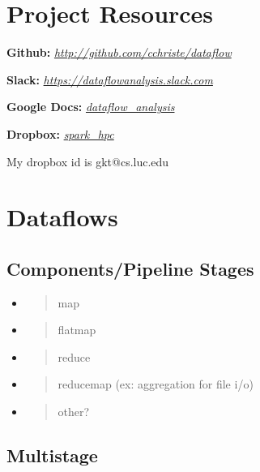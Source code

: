 \section{Project Resources}\label{project-resources}

\textbf{Github:}
\href{http://github.com/cchriste/dataflow}{\emph{http://github.com/cchriste/dataflow}}

\textbf{Slack:}
\href{https://dataflowanalysis.slack.com}{\emph{https://dataflowanalysis.slack.com}}

\textbf{Google Docs:}
\href{https://drive.google.com/folderview?id=0BxLkEMNd9q6FfmpRaFZXSGlPc0JsSDdVdndCUm83SzN6UnlLVEk5T3ZsZmJ0VEVGREtNTkE\&usp=sharing}{\emph{dataflow\_analysis}}

\textbf{Dropbox:}
\href{https://www.dropbox.com/sh/odsd9uxe1elbhbf/AAD8J1TGuFY1VHJl2oPdm5E0a?dl=0}{\emph{spark\_hpc}}

My dropbox id is gkt@cs.luc.edu

\section{Dataflows}\label{dataflows}

\subsection{Components/Pipeline Stages}\label{componentspipeline-stages}

\begin{itemize}
\item
  \begin{quote}
  map
  \end{quote}
\item
  \begin{quote}
  flatmap
  \end{quote}
\item
  \begin{quote}
  reduce
  \end{quote}
\item
  \begin{quote}
  reducemap (ex: aggregation for file i/o)
  \end{quote}
\item
  \begin{quote}
  other?
  \end{quote}
\end{itemize}

\subsection{Multistage}\label{multistage}

